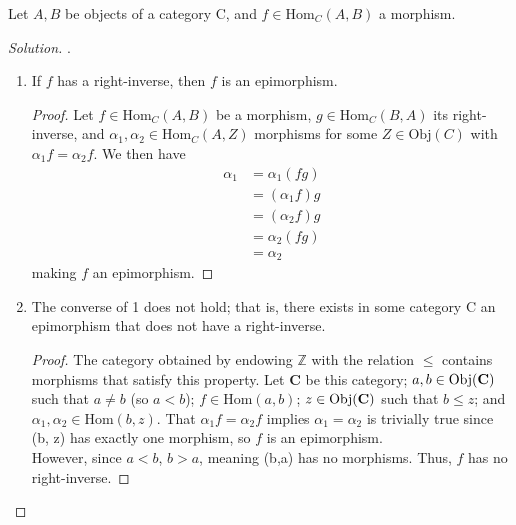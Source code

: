 \documentclass[12pt]{article}
\newenvironment{problem}[2][Problem]{\begin{trivlist}
\item[\hskip \labelsep {\bfseries #1}\hskip \labelsep {\bfseries #2.}]}{\end{trivlist}}
\newcommand{\catname}[1]{\normalfont\textbf{#1}}
\newcommand{\Hom}{\text{Hom}}
\newcommand{\Obj}[1]{\text{Obj}(\catname{C})}
\newenvironment{solution}
  {\renewcommand\qedsymbol{$\blacksquare$}\begin{proof}[Solution]}
{\end{proof}}
\newenvironment{sproof}{
  \renewcommand\qedsymbol{$\square$}
  \begin{proof}
  }{
  \end{proof}
}
\begin{document}
\begin{problem}{4.3}
  Let $A,B$ be objects of a category C, and $f\in \text{Hom}_C(A,B)$ a morphism.
\end{problem}
\begin{solution}.
  \begin{enumerate}
    \item If $f$ has a right-inverse, then $f$ is an epimorphism.
      \begin{sproof}
        Let $f\in \text{Hom}_C(A,B)$ be a morphism, $g\in \text{Hom}_C(B,A)$ its right-inverse, and $\alpha_1, \alpha_2 \in \text{Hom}_C(A,Z)$ morphisms for some $Z\in \text{Obj}(C)$ with $\alpha_1f=\alpha_2f$.
        We then have
        \begin{align*}
          \alpha_1 &= \alpha_1(fg)\\
          &= (\alpha_1f)g\\
          &= (\alpha_2f)g\\
          &= \alpha_2(fg)\\
          &= \alpha_2
        \end{align*}
        making $f$ an epimorphism.
      \end{sproof}
    \item The converse of 1 does not hold; that is, there exists in some category C an epimorphism that does not have a right-inverse.
      \begin{sproof}
        The category obtained by endowing $\mathbb{Z}$ with the relation $\leq$ contains morphisms that satisfy this property.
        Let \catname{C} be this category; $a, b \in \Obj{C}$ such that $a\neq b$ (so $a < b$); $f \in \Hom(a, b)$; $z \in \Obj{C}$ such that $b \leq z$; and $\alpha_1, \alpha_2 \in \Hom(b, z)$. 
        That $\alpha_1f = \alpha_2f$ implies $\alpha_1=\alpha_2$ is trivially true since \Hom(b, z) has exactly one morphism, so $f$ is an epimorphism. \\
        However, since $a < b$, $b > a$, meaning \Hom(b,a) has no morphisms. Thus, $f$ has no right-inverse.

      \end{sproof}
  \end{enumerate}
\end{solution}

\newpage
\end{document}
